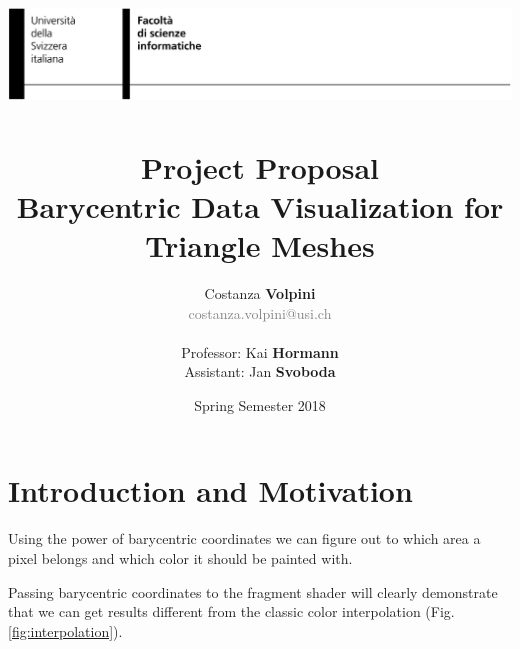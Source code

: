\documentclass[11pt]{article}
\title{ \includegraphics[width=\linewidth]{header.png}~ 
\\[0.5cm]
  \huge{Project Proposal} \\
\textbf{\Large{Barycentric Data Visualization for Triangle Meshes}}}
\date{Spring Semester 2018}
\author{Costanza \textbf{Volpini} \\ \textcolor{gray}{costanza.volpini@usi.ch} \\ \\ Professor: Kai \textbf{Hormann} \\ Assistant: Jan \textbf{Svoboda}}
\begin{document}
\pagestyle{fancy}
\maketitle

\section{Introduction and Motivation}

Using the power of barycentric coordinates we can figure out to which area a pixel belongs and which 
color it should be painted with. 

Passing barycentric coordinates to the fragment shader will clearly demonstrate that we can get results different from the classic
color interpolation (Fig.\ref{fig:interpolation}).
\end{document}
